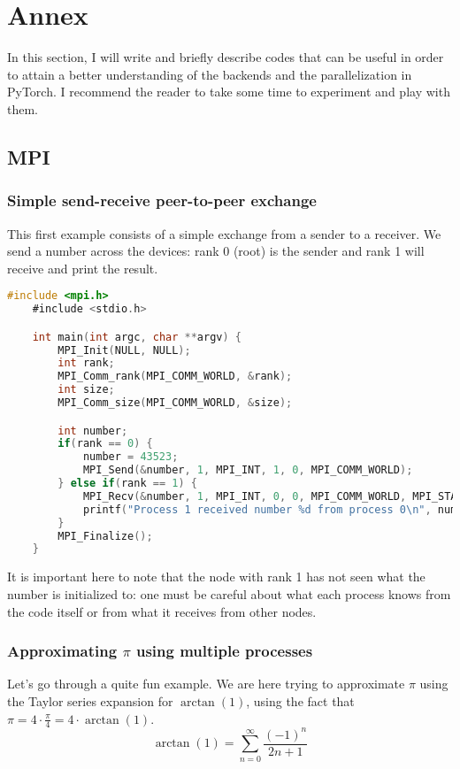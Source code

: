 \section{Annex}
In this section, I will write and briefly describe codes that can be useful in order to attain a better understanding of the backends and the parallelization in PyTorch. I recommend the reader to take some time to experiment and play with them.

\subsection{MPI}
\subsubsection{Simple send-receive peer-to-peer exchange}
This first example consists of a simple exchange from a sender to a receiver. We send a number across the devices: rank 0 (root) is the sender and rank 1 will receive and print the result.

\begin{lstlisting}[language=C]
    #include <mpi.h>
    #include <stdio.h>

    int main(int argc, char **argv) {
        MPI_Init(NULL, NULL);
        int rank;
        MPI_Comm_rank(MPI_COMM_WORLD, &rank);
        int size;
        MPI_Comm_size(MPI_COMM_WORLD, &size);

        int number;
        if(rank == 0) {
            number = 43523;
            MPI_Send(&number, 1, MPI_INT, 1, 0, MPI_COMM_WORLD);
        } else if(rank == 1) {
            MPI_Recv(&number, 1, MPI_INT, 0, 0, MPI_COMM_WORLD, MPI_STATUS_IGNORE);
            printf("Process 1 received number %d from process 0\n", number);
        }
        MPI_Finalize();
    }
\end{lstlisting}

It is important here to note that the node with rank 1 has not seen what the number is initialized to: one must be careful about what each process knows from the code itself or from what it receives from other nodes.

\subsubsection{Approximating \texorpdfstring{$\pi$}{pi} using multiple processes}
Let's go through a quite fun example. We are here trying to approximate \(\pi\) using the Taylor series expansion for \(\arctan(1)\), using the fact that \(\pi=4\cdot \frac{\pi}{4}=4\cdot \arctan(1)\).
\[\arctan(1)=\sum_{n=0}^{\infty} \frac{(-1)^n}{2n+1}\]

